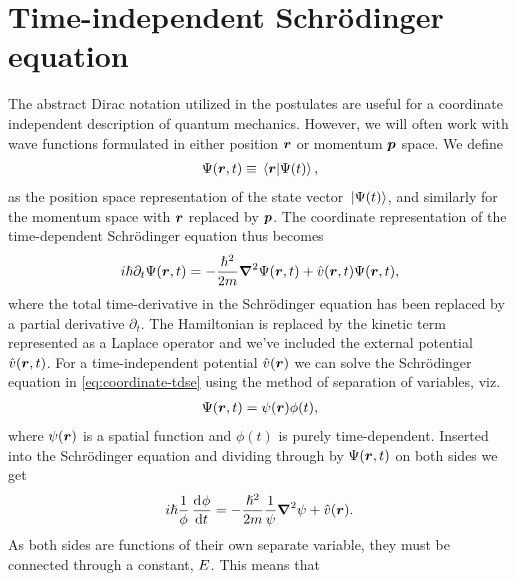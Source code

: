     \section{Time-independent Schrödinger equation}
        The abstract Dirac notation utilized in the postulates are useful for a
        coordinate independent description of quantum mechanics.
        However, we will often work with wave functions formulated in either
        position $\boldsymbol{r}$ or momentum $\boldsymbol{p}$ space.
        We define
        \begin{align}
            \Psi(\boldsymbol{r}, t) \equiv \braket*{\boldsymbol{r}}{\Psi(t)},
        \end{align}
        as the position space representation of the state vector
        $\ket*{\Psi(t)}$, and similarly for the momentum space with $\boldsymbol{r}$
        replaced by $\boldsymbol{p}$.
        The coordinate representation of the time-dependent Schrödinger equation
        thus becomes
        \begin{align}
            i\hslash\partial_t\Psi(\boldsymbol{r}, t)
            = -\frac{\hslash^2}{2m}\boldsymbol{\nabla}^2\Psi(\boldsymbol{r}, t)
            + \hat{v}(\boldsymbol{r}, t)\Psi(\boldsymbol{r}, t),
            \label{eq:coordinate-tdse}
        \end{align}
        where the total time-derivative in the Schrödinger equation has been
        replaced by a partial derivative $\partial_t$.
        The Hamiltonian is replaced by the kinetic term represented as a Laplace
        operator and we've included the external potential $\hat{v}(\boldsymbol{r},
        t)$.
        For a time-independent potential $\hat{v}(\boldsymbol{r})$ we can solve the
        Schrödinger equation in \autoref{eq:coordinate-tdse} using the method of
        separation of variables, viz.
        \begin{align}
            \Psi(\boldsymbol{r}, t) = \psi(\boldsymbol{r})\phi(t),
        \end{align}
        where $\psi(\boldsymbol{r})$ is a spatial function and $\phi(t)$ is purely
        time-dependent.
        Inserted into the Schrödinger equation and dividing through by
        $\Psi(\boldsymbol{r}, t)$ on both sides we get
        \begin{align}
            i\hslash\frac{1}{\phi}\dod{\phi}{t}
            = -\frac{\hslash^2}{2m}\frac{1}{\psi}
            \vfg{\nabla}^2\psi + \hat{v}(\vfg{r}).
        \end{align}
        As both sides are functions of their own separate variable, they must be
        connected through a constant, $E$.
        This means that

